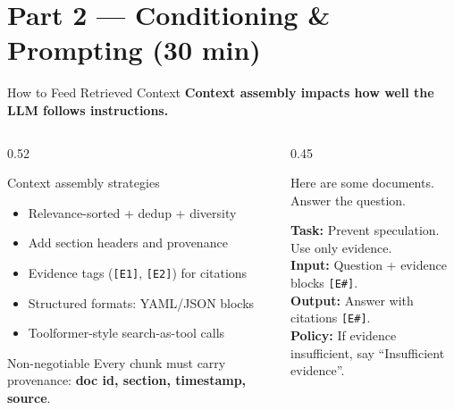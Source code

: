 \documentclass[aspectratio=169, xcolor=table]{beamer}
\newif\ifanimated
\newcommand{\cpause}{\ifanimated\pause\fi}
\begin{document}
\section{Part 2 --- Conditioning \& Prompting (30 min)}
\begin{frame}{How to Feed Retrieved Context}
\textbf{Context assembly impacts how well the LLM follows instructions.}

\vspace{0.3em}
\begin{columns}[T]
\begin{column}{0.52\textwidth}
\begin{block}{Context assembly strategies}
\footnotesize
\begin{itemize}
  \item Relevance-sorted + dedup + diversity
  \item Add section headers and provenance
  \item Evidence tags (\texttt{[E1]}, \texttt{[E2]}) for citations
  \item Structured formats: YAML/JSON blocks
  \item Toolformer-style search-as-tool calls
\end{itemize}
\end{block}

\cpause
\begin{alertblock}{Non-negotiable}
\footnotesize
Every chunk must carry provenance: \textbf{doc id, section, timestamp, source}.
\end{alertblock}
\end{column}

\begin{column}{0.45\textwidth}
\footnotesize
\begin{tcolorbox}[colback=gen!5,colframe=gen!50,title=Bad prompt]
\tiny
Here are some documents. Answer the question.
\end{tcolorbox}

\cpause
\vspace{0.2em}
\begin{tcolorbox}[colback=prompt!7,colframe=prompt!60,title=Good prompt]
\tiny
\textbf{Task:} Prevent speculation. Use only evidence.\\
\textbf{Input:} Question + evidence blocks \texttt{[E\#]}.\\
\textbf{Output:} Answer with citations \texttt{[E\#]}.\\
\textbf{Policy:} If evidence insufficient, say ``Insufficient evidence''.
\end{tcolorbox}
\end{column}
\end{columns}
\end{frame}
\end{document}
